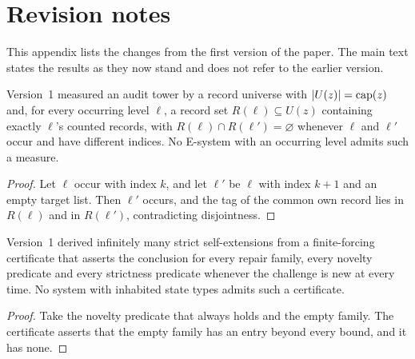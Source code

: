 \section{Revision notes}\label{app:revisions}

This appendix lists the changes from the first version of the paper. The main text states the
results as they now stand and does not refer to the earlier version.

\begin{proposition}\label{prop:e2-v1-vacuous}
Version~1 measured an audit tower by a record universe with $|U(z)| = \operatorname{cap}(z)$ and, for every
occurring level $\ell$, a record set $R(\ell) \subseteq U(z)$ containing exactly $\ell$'s counted
records, with $R(\ell) \cap R(\ell') = \varnothing$ whenever $\ell$ and $\ell'$ occur and have
different indices. No E-system with an occurring level admits such a measure.
\end{proposition}

\begin{proof}
Let $\ell$ occur with index $k$, and let $\ell'$ be $\ell$ with index $k + 1$ and an empty target
list. Then $\ell'$ occurs, and the tag of the common own record lies in $R(\ell)$ and in $R(\ell')$,
contradicting disjointness.
\end{proof}

\begin{proposition}\label{prop:e1-v1-vacuous}
Version~1 derived infinitely many strict self-extensions from a finite-forcing certificate that
asserts the conclusion for every repair family, every novelty predicate and every strictness
predicate whenever the challenge is new at every time. No system with inhabited state types admits
such a certificate.
\end{proposition}

\begin{proof}
Take the novelty predicate that always holds and the empty family. The certificate asserts that the
empty family has an entry beyond every bound, and it has none.
\end{proof}

